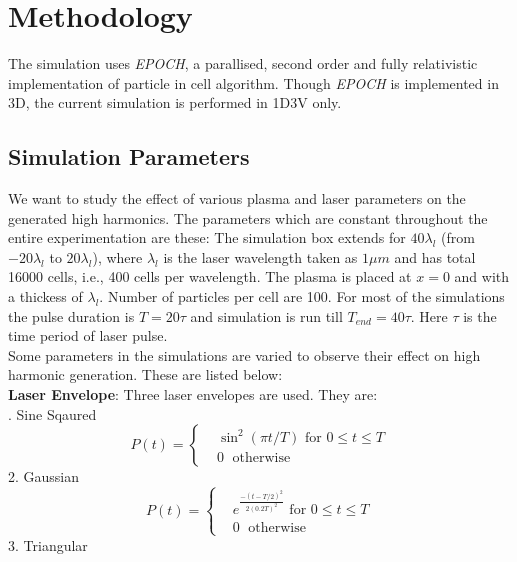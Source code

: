 \documentclass[12pt]{article}
\newenvironment{changemargin}[2]{%
\begin{list}{}{%
\setlength{\topsep}{0pt}%
\setlength{\leftmargin}{#1}%
\setlength{\rightmargin}{#2}%
\setlength{\listparindent}{\parindent}%
\setlength{\itemindent}{\parindent}%
\setlength{\parsep}{\parskip}%
}%
\item[]}{\end{list}}
\begin{document}
\begin{changemargin}{-2cm}{-2cm}
    \section{Methodology}

    The simulation uses \textit{EPOCH}, a parallised, second order and fully relativistic implementation of particle in cell algorithm.\cite{EPOCH} Though \textit{EPOCH} is implemented in 3D, the current simulation is performed in 1D3V only.
    \subsection{Simulation Parameters}
    We want to study the effect of various plasma and laser parameters on the generated high harmonics. The parameters which are constant throughout the entire experimentation are these:
    The simulation box extends for $40 \lambda _l$ (from $-20 \lambda _l$ to $20 \lambda _l$), where $\lambda_l$ is the laser wavelength taken as $1\mu m$ and has total 16000 cells, i.e., 400 cells per wavelength. The plasma is placed at $x=0$ and with a thickess of $\lambda_l$. Number of particles per cell are 100.
    For most of the simulations the pulse duration is $T = 20 \tau$ and simulation is run till $T_{end} = 40 \tau$. Here $\tau$ is the time period of laser pulse.\\
    Some parameters in the simulations are varied to observe their effect on high harmonic generation. These are listed below:\\
    \textbf{Laser Envelope}:
    Three laser envelopes are used. They are:\\
    . Sine Sqaured
    \begin{equation}\label{sin-sq-env}
        P(t)=
        \begin{cases}
             & \sin^2(\pi t/T) \text{ for } 0 \leq t \le T \\
             & 0         \;      \text{ otherwise }
        \end{cases}
    \end{equation}
    2. Gaussian
    \begin{equation}\label{gaussian-env}
        P(t)=
        \begin{cases}
             & e^{\frac{-(t-T/2)^2}{2(0.2T)^2}} \text{ for } 0 \leq t \le T \\
             & 0         \;      \text{ otherwise }
        \end{cases}
    \end{equation}
    3. Triangular

\end{changemargin}
\end{document}
